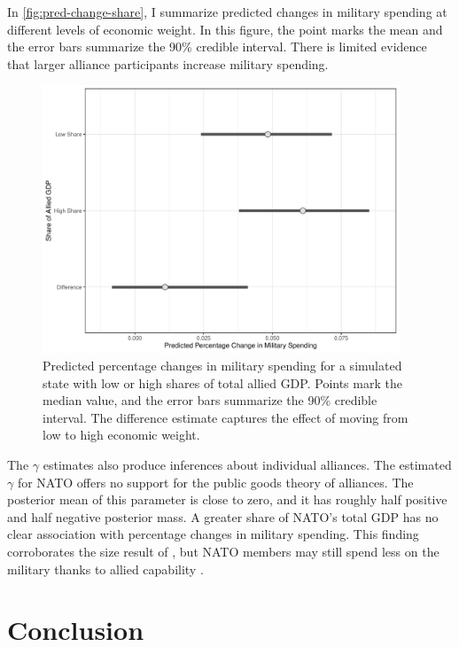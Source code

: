 \documentclass[12pt]{article}
\begin{document}
In \autoref{fig:pred-change-share}, I summarize predicted changes in military spending at different levels of economic weight. 
In this figure, the point marks the mean and the error bars summarize the 90\% credible interval. 
There is limited evidence that larger alliance participants increase military spending. 

\begin{figure}[htbp]
	\centering
		\includegraphics[width=0.95\textwidth]{pred-change-share.pdf}
	\caption{Predicted percentage changes in military spending for a simulated state with low or high shares of total allied GDP. Points mark the median value, and the error bars summarize the 90\% credible interval. The difference estimate captures the effect of moving from low to high economic weight.}
	\label{fig:pred-change-share}
\end{figure}


The $\gamma$ estimates also produce inferences about individual alliances.
The estimated $\gamma$ for NATO offers no support for the public goods theory of alliances. 
The posterior mean of this parameter is close to zero, and it has roughly half positive and half negative posterior mass.  
A greater share of NATO's total GDP has no clear association with percentage changes in military spending. 
This finding corroborates the size result of \citet{PluemperNeumayer2015}, but NATO members may still spend less on the military thanks to allied capability \citep{GeorgeSandler2017}.


\section{Conclusion}
\end{document}
